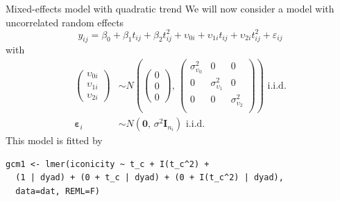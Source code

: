 \documentclass[aspectratio=169]{beamer}
\newcommand{\vect}[1]{\mathbf{#1}}
\newcommand{\mat}[1]{\mathbf{#1}}
\newcommand{\gvect}[1]{\boldsymbol{#1}}
\begin{document}
\begin{frame}[fragile]{Mixed-effects model with quadratic trend}
  We will now consider a model with uncorrelated random effects
  \[
    y_{ij} = \beta_0 + \beta_1 t_{ij} + \beta_2 t^2_{ij} + \upsilon_{0i} +
    \upsilon_{1i} t_{ij} + \upsilon_{2i} t^2_{ij} + \varepsilon_{ij}
  \]
with
\begin{align*}
  \begin{pmatrix}
    \upsilon_{0i}\\
    \upsilon_{1i}\\
    \upsilon_{2i}
  \end{pmatrix} &\sim
  N \left(\begin{pmatrix}
      0\\ 0\\ 0
  \end{pmatrix}, \,
  \begin{pmatrix}
    \sigma^2_{\upsilon_0} & 0 & 0\\
    0 & \sigma^2_{\upsilon_1} & 0\\
    0 & 0 & \sigma^2_{\upsilon_2}\\
      \end{pmatrix} \right)
    \text{ i.i.d.} \\
  \gvect{\varepsilon}_i &\sim N(\vect{0}, \, \sigma^2 \mat{I}_{n_i})
    \text{ i.i.d.}
\end{align*}
  This model is fitted by
\begin{lstlisting}
gcm1 <- lmer(iconicity ~ t_c + I(t_c^2) +
  (1 | dyad) + (0 + t_c | dyad) + (0 + I(t_c^2) | dyad),
  data=dat, REML=F)
\end{lstlisting}
\end{frame}
\end{document}
